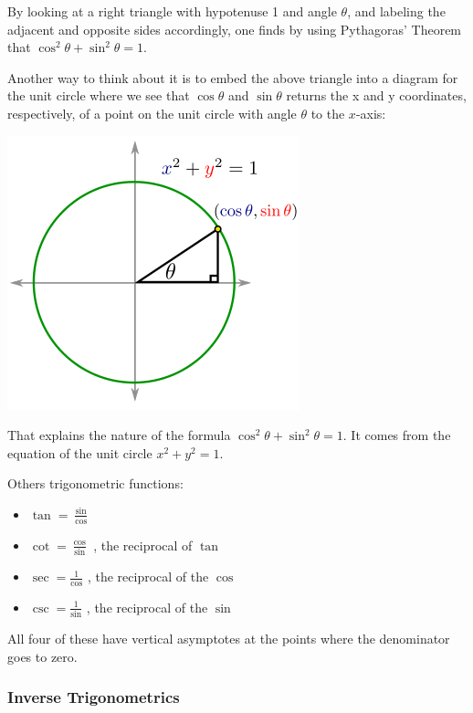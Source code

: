 \documentclass[twoside,openright,titlepage,a4paper]{book}
\begin{document}
\begin{sloppypar}
By looking at a right triangle with hypotenuse 1 and angle $\theta$, and labeling the adjacent and opposite sides accordingly, one finds by using Pythagoras' Theorem that ${\cos^2 \theta + \sin^2 \theta = 1}$.

Another way to think about it is to embed the above triangle into a diagram for the unit circle where we see that ${\cos\theta}$ and ${\sin\theta}$ returns the x and y coordinates, respectively, of a point on the unit circle with angle $\theta$ to the $x$-axis:
\begin{center}
\includegraphics[scale=0.6]{UnitCircle}
\end{center}

That explains the nature of the formula ${\cos^{2} \theta+\sin^{2} \theta=1}$. It comes from the equation of the unit circle ${x^2 + y^2 = 1}$.

Others trigonometric functions:
\begin{itemize}
\item[] ${\tan=\displaystyle\frac{\sin}{\cos}}$
\item[] ${\cot=\displaystyle\frac{\cos}{\sin}}$ , the reciprocal of $\tan$\\
\item[] ${\sec=\displaystyle\frac{1}{\cos}}$ , the reciprocal of the $\cos$\\
\item[] ${\csc=\displaystyle\frac{1}{\sin}}$ , the reciprocal of the $\sin$
\end{itemize}

All four of these have vertical asymptotes at the points where the denominator goes to zero.

\subsubsection{Inverse Trigonometrics}


\end{sloppypar}
\end{document}
